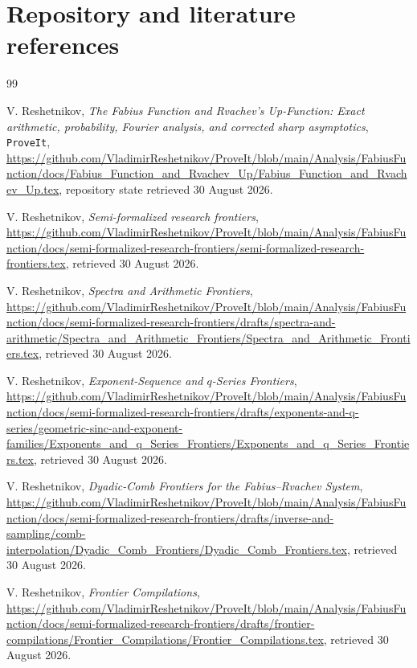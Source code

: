 \documentclass[11pt,oneside]{article}
\theoremstyle{definition}
\theoremstyle{remark}
\begin{document}
\section{Repository and literature references}

\begin{thebibliography}{99}

V. Reshetnikov,
\emph{The Fabius Function and Rvachev's Up-Function: Exact arithmetic,
probability, Fourier analysis, and corrected sharp asymptotics},
\texttt{ProveIt},
\url{https://github.com/VladimirReshetnikov/ProveIt/blob/main/Analysis/FabiusFunction/docs/Fabius_Function_and_Rvachev_Up/Fabius_Function_and_Rvachev_Up.tex},
repository state retrieved 30 August 2026.

V. Reshetnikov,
\emph{Semi-formalized research frontiers},
\url{https://github.com/VladimirReshetnikov/ProveIt/blob/main/Analysis/FabiusFunction/docs/semi-formalized-research-frontiers/semi-formalized-research-frontiers.tex},
retrieved 30 August 2026.

V. Reshetnikov,
\emph{Spectra and Arithmetic Frontiers},
\url{https://github.com/VladimirReshetnikov/ProveIt/blob/main/Analysis/FabiusFunction/docs/semi-formalized-research-frontiers/drafts/spectra-and-arithmetic/Spectra_and_Arithmetic_Frontiers/Spectra_and_Arithmetic_Frontiers.tex},
retrieved 30 August 2026.

V. Reshetnikov,
\emph{Exponent-Sequence and $q$-Series Frontiers},
\url{https://github.com/VladimirReshetnikov/ProveIt/blob/main/Analysis/FabiusFunction/docs/semi-formalized-research-frontiers/drafts/exponents-and-q-series/geometric-sinc-and-exponent-families/Exponents_and_q_Series_Frontiers/Exponents_and_q_Series_Frontiers.tex},
retrieved 30 August 2026.

V. Reshetnikov,
\emph{Dyadic-Comb Frontiers for the Fabius--Rvachev System},
\url{https://github.com/VladimirReshetnikov/ProveIt/blob/main/Analysis/FabiusFunction/docs/semi-formalized-research-frontiers/drafts/inverse-and-sampling/comb-interpolation/Dyadic_Comb_Frontiers/Dyadic_Comb_Frontiers.tex},
retrieved 30 August 2026.

V. Reshetnikov,
\emph{Frontier Compilations},
\url{https://github.com/VladimirReshetnikov/ProveIt/blob/main/Analysis/FabiusFunction/docs/semi-formalized-research-frontiers/drafts/frontier-compilations/Frontier_Compilations/Frontier_Compilations.tex},
retrieved 30 August 2026.


\end{thebibliography}
\end{document}
